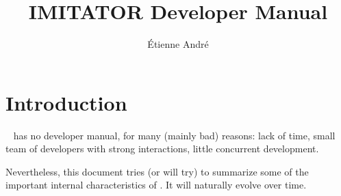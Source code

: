 
\newcommand{\titleOnHeader}{\textsf{IMITATOR} \emph{not} a Developer Manual}

\newcommand{\titleOnFirstPage}{IMITATOR \emph{not} a Developer Manual}




\title{IMITATOR Developer Manual}
\author{Étienne André}
	










\chapter{Introduction}

\imitator{}~\cite{AFKS12} has no developer manual, for many (mainly bad) reasons:
lack of time, small team of developers with strong interactions, little concurrent development.

Nevertheless, this document tries (or will try) to summarize some of the important internal characteristics of \imitator{}.
It will naturally evolve over time.


